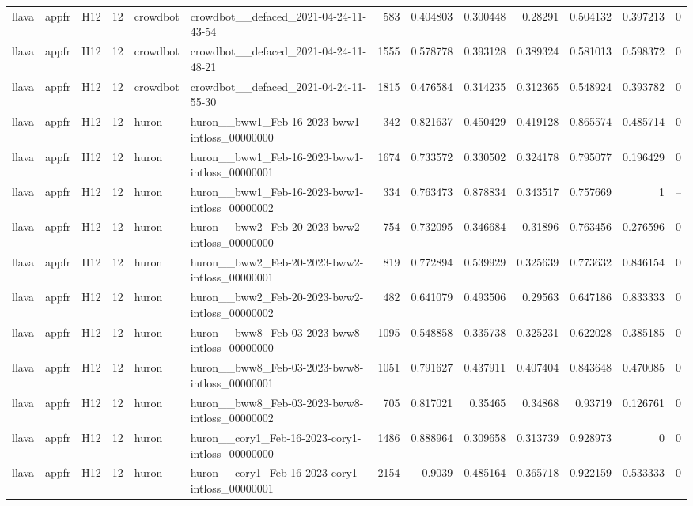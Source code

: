 \begin{longtable}{lllrllrrrrrrr}
llava & appfr & H12 & 12 & crowdbot & crowdbot\_\_defaced\_2021-04-24-11-43-54 & 583 & 0.404803 & 0.300448 & 0.28291 & 0.504132 & 0.397213 & 0 \\
llava & appfr & H12 & 12 & crowdbot & crowdbot\_\_defaced\_2021-04-24-11-48-21 & 1555 & 0.578778 & 0.393128 & 0.389324 & 0.581013 & 0.598372 & 0 \\
llava & appfr & H12 & 12 & crowdbot & crowdbot\_\_defaced\_2021-04-24-11-55-30 & 1815 & 0.476584 & 0.314235 & 0.312365 & 0.548924 & 0.393782 & 0 \\
llava & appfr & H12 & 12 & huron & huron\_\_bww1\_Feb-16-2023-bww1-intloss\_00000000 & 342 & 0.821637 & 0.450429 & 0.419128 & 0.865574 & 0.485714 & 0 \\
llava & appfr & H12 & 12 & huron & huron\_\_bww1\_Feb-16-2023-bww1-intloss\_00000001 & 1674 & 0.733572 & 0.330502 & 0.324178 & 0.795077 & 0.196429 & 0 \\
llava & appfr & H12 & 12 & huron & huron\_\_bww1\_Feb-16-2023-bww1-intloss\_00000002 & 334 & 0.763473 & 0.878834 & 0.343517 & 0.757669 & 1 & -- \\
llava & appfr & H12 & 12 & huron & huron\_\_bww2\_Feb-20-2023-bww2-intloss\_00000000 & 754 & 0.732095 & 0.346684 & 0.31896 & 0.763456 & 0.276596 & 0 \\
llava & appfr & H12 & 12 & huron & huron\_\_bww2\_Feb-20-2023-bww2-intloss\_00000001 & 819 & 0.772894 & 0.539929 & 0.325639 & 0.773632 & 0.846154 & 0 \\
llava & appfr & H12 & 12 & huron & huron\_\_bww2\_Feb-20-2023-bww2-intloss\_00000002 & 482 & 0.641079 & 0.493506 & 0.29563 & 0.647186 & 0.833333 & 0 \\
llava & appfr & H12 & 12 & huron & huron\_\_bww8\_Feb-03-2023-bww8-intloss\_00000000 & 1095 & 0.548858 & 0.335738 & 0.325231 & 0.622028 & 0.385185 & 0 \\
llava & appfr & H12 & 12 & huron & huron\_\_bww8\_Feb-03-2023-bww8-intloss\_00000001 & 1051 & 0.791627 & 0.437911 & 0.407404 & 0.843648 & 0.470085 & 0 \\
llava & appfr & H12 & 12 & huron & huron\_\_bww8\_Feb-03-2023-bww8-intloss\_00000002 & 705 & 0.817021 & 0.35465 & 0.34868 & 0.93719 & 0.126761 & 0 \\
llava & appfr & H12 & 12 & huron & huron\_\_cory1\_Feb-16-2023-cory1-intloss\_00000000 & 1486 & 0.888964 & 0.309658 & 0.313739 & 0.928973 & 0 & 0 \\
llava & appfr & H12 & 12 & huron & huron\_\_cory1\_Feb-16-2023-cory1-intloss\_00000001 & 2154 & 0.9039 & 0.485164 & 0.365718 & 0.922159 & 0.533333 & 0 \\

\end{longtable}
